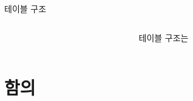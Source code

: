 \documentclass[mathserif, aspectratio=169]{beamer}
\begin{document}
\begin{frame}{테이블 구조}
    \begin{columns}
        \begin{column}{0.5\linewidth}
            
        \end{column}
        \begin{column}{0.5\linewidth}
            테이블 구조는 
        \end{column}
    \end{columns}
\end{frame}
\section{함의}
\end{document}
